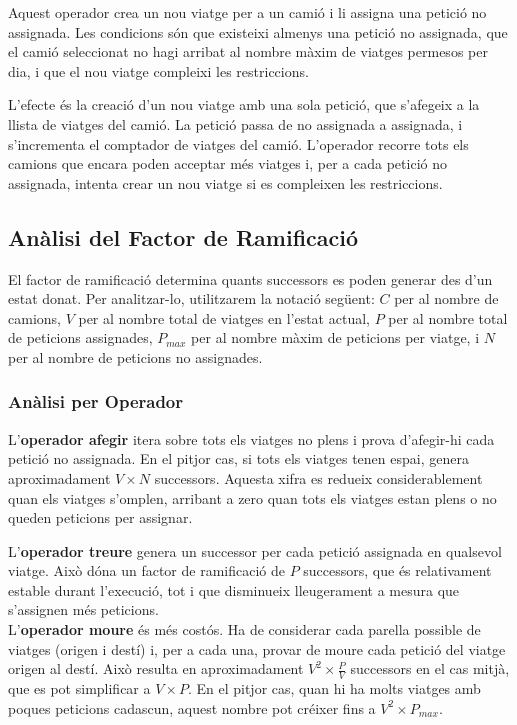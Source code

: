 Aquest operador crea un nou viatge per a un camió i li assigna una petició no assignada. Les condicions són que existeixi almenys una petició no assignada, que el camió seleccionat no hagi arribat al nombre màxim de viatges permesos per dia, i que el nou viatge compleixi les restriccions.

L'efecte és la creació d'un nou viatge amb una sola petició, que s'afegeix a la llista de viatges del camió. La petició passa de no assignada a assignada, i s'incrementa el comptador de viatges del camió. L'operador recorre tots els camions que encara poden acceptar més viatges i, per a cada petició no assignada, intenta crear un nou viatge si es compleixen les restriccions.

\subsection{Anàlisi del Factor de Ramificació}

El factor de ramificació determina quants successors es poden generar des d'un estat donat. Per analitzar-lo, utilitzarem la notació següent: $C$ per al nombre de camions, $V$ per al nombre total de viatges en l'estat actual, $P$ per al nombre total de peticions assignades, $P_{max}$ per al nombre màxim de peticions per viatge, i $N$ per al nombre de peticions no assignades.

\subsubsection{Anàlisi per Operador}

L'\textbf{operador afegir} itera sobre tots els viatges no plens i prova d'afegir-hi cada petició no assignada. En el pitjor cas, si tots els viatges tenen espai, genera aproximadament $V \times N$ successors. Aquesta xifra es redueix considerablement quan els viatges s'omplen, arribant a zero quan tots els viatges estan plens o no queden peticions per assignar.

\vspace{0.5em}  
L'\textbf{operador treure} genera un successor per cada petició assignada en qualsevol viatge. Això dóna un factor de ramificació de $P$ successors, que és relativament estable durant l'execució, tot i que disminueix lleugerament a mesura que s'assignen més peticions.\\[0.5em] 

L'\textbf{operador moure} és més costós. Ha de considerar cada parella possible de viatges (origen i destí) i, per a cada una, provar de moure cada petició del viatge origen al destí. Això resulta en aproximadament $V^2 \times \frac{P}{V}$ successors en el cas mitjà, que es pot simplificar a $V \times P$. En el pitjor cas, quan hi ha molts viatges amb poques peticions cadascun, aquest nombre pot créixer fins a $V^2 \times P_{max}$.

